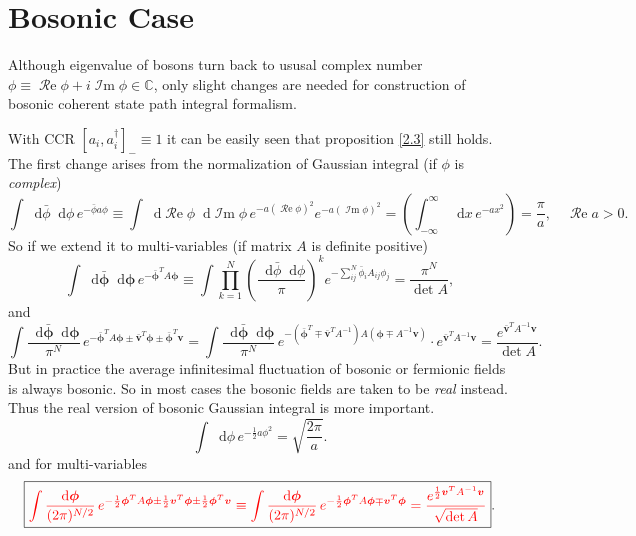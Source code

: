 \documentclass[10pt,nofootinbib]{revtex4}
\newcommand*\dd{\mathop{}\!\mathrm{d}}
\def\Re{\mathop{\mathcal{R}e}}
\def\Im{\mathop{\mathcal{I}m}}
\begin{document}
\section{Bosonic Case}
	Although eigenvalue of bosons turn back to ususal complex number $\phi\equiv\Re \phi+i\Im\phi\in\mathbb{C}$, only slight changes are needed for construction of bosonic coherent state path integral formalism.\par
	With CCR $[a_i,a_i^\dagger]_-\equiv1$ it can be easily seen that proposition \eqref{2.3} still holds. The first change arises from the normalization of Gaussian integral (if $\phi$ is \emph{complex})
	\begin{equation*}
		\int\dd\bar\phi\dd\phi\,e^{-\bar\phi a\phi}\equiv\int\dd\Re\phi\dd\Im\phi\,e^{-a(\Re\phi)^2}e^{-a(\Im\phi)^2}=\left(\int_{-\infty}^{\infty}\dd x\,e^{-ax^2}\right)=\dfrac{\pi}{a},\quad \Re a>0.
	\end{equation*}
	So if we extend it to multi-variables (if matrix $A$ is definite positive)
	\begin{equation*}
		\int\dd\bm{\bar\phi}\dd\bm{\phi}\,e^{-\bm{\bar\phi}^TA\bm{\phi}}\equiv\int\prod_{k=1}^N\left(\dfrac{\dd\bar\phi\dd\phi}{\pi}\right)^ke^{-\sum_{ij}^N\bar\phi_i A_{ij}\phi_j}=\dfrac{\pi^N}{\det A},
	\end{equation*}
	and
	\begin{equation*}
		\int\dfrac{\dd\bm{\bar\phi}\dd\bm{\phi}}{\pi^N}\,e^{-\bm{\bar\phi}^T A\bm{\phi}\pm\bm{\bar v}^T\bm{\phi}\pm\bm{\bar\phi}^T\bm{v}}=\int\dfrac{\dd\bm{\bar\phi}\dd\bm{\phi}}{\pi^N}\,e^{-(\bm{\bar\phi}^T\mp\bm{\bar v}^TA^{-1})A(\bm{\phi}\mp A^{-1}\bm{v})}\cdot e^{\bm{\bar v}^T A^{-1}\bm{v}}=\dfrac{e^{\bm{\bar v}^T A^{-1}\bm{v}}}{\det A}.
	\end{equation*}
	But in practice the average infinitesimal fluctuation of bosonic or fermionic fields is always bosonic. So in most cases the bosonic fields are taken to be \emph{real} instead. Thus the real version of bosonic Gaussian integral is more important.
	\begin{equation}\label{3.1}
		\int\dd\phi\,e^{-\frac12a\phi^2}=\sqrt{\dfrac{2\pi}{a}}.
	\end{equation}
	and for multi-variables
	\begin{equation}\label{3.2}
		\boxed{\color{red}\int\dfrac{\dd\bm{\phi}}{(2\pi)^{N/2}}\,e^{-\frac12\bm{\phi}^T A\bm{\phi}\pm\frac12\bm{v}^T\bm{\phi}\pm\frac12\bm{\phi}^T\bm{v}}\equiv\int\dfrac{\dd\bm{\phi}}{(2\pi)^{N/2}}\,e^{-\frac12\bm{\phi}^T A\bm{\phi}\mp\bm{ v}^T\bm{\phi}}=\dfrac{e^{\frac12\bm{v}^T A^{-1}\bm{v}}}{\sqrt{\det A}}}.
	\end{equation}
\end{document}
